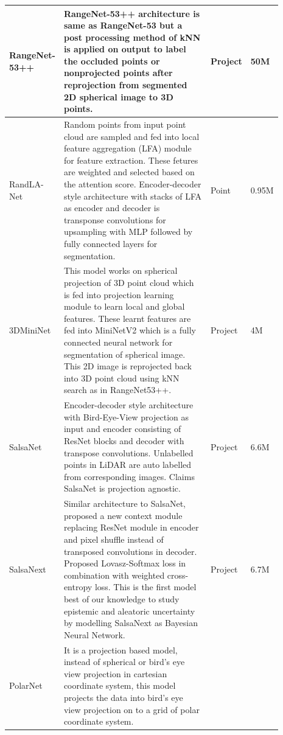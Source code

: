 \begin{longtable}{|p{0.15\linewidth} | p{0.59\linewidth}| p{0.06\linewidth} |p{0.09\linewidth}|}
            RangeNet-53++\cite{Milioto2019} &
            RangeNet-53++ architecture is same as RangeNet-53 but a post processing 
            method of kNN is applied on output to label the occluded points or nonprojected points after reprojection from segmented 2D spherical image to 3D points.
            & Project & 50M \\
            \hline
            RandLA-Net\cite{Hu_2020_CVPR_Randla} & 
            Random points from input point cloud are sampled and fed into local feature aggregation (LFA) module for feature extraction.
            These fetures are weighted and selected based on the attention score. 
            Encoder-decoder style architecture with stacks of LFA as encoder and decoder is transponse convolutions for upsampling with MLP followed by fully connected layers for segmentation.
            & Point & 0.95M \\
            \hline 
            3DMiniNet\cite{3Dmininet} &
            This model works on spherical projection of 3D point cloud which is fed into projection learning module to learn local and global features.
            These learnt features are fed into MiniNetV2 which is a fully connected neural network for segmentation of spherical image.
            This 2D image is reprojected back into 3D point cloud using kNN search as in RangeNet53++.
            & Project & 4M \\
            \hline
            SalsaNet\cite{salsanet2020} & Encoder-decoder style architecture with Bird-Eye-View projection as input and encoder consisting of ResNet blocks and decoder with transpose convolutions.
            Unlabelled points in LiDAR are auto labelled from corresponding images. Claims SalsaNet is projection agnostic.
            & Project & 6.6M \\
            \hline
            SalsaNext\cite{SalsaNext_2020} & 
            Similar architecture to SalsaNet, proposed a new context module replacing ResNet module in encoder and pixel shuffle instead of transposed convolutions in decoder.
            Proposed Lovasz-Softmax loss in combination with weighted cross-entropy loss.
            This is the first model best of our knowledge to study epistemic and aleatoric uncertainty by modelling SalsaNext as Bayesian Neural Network.
            & Project & 6.7M \\
            \hline
            PolarNet\cite{polarnet} &
            It is a projection based model, instead of spherical or bird's eye view projection in cartesian coordinate system, this model projects the data into bird's eye view projection on to a grid of polar coordinate system.

\end{longtable}
